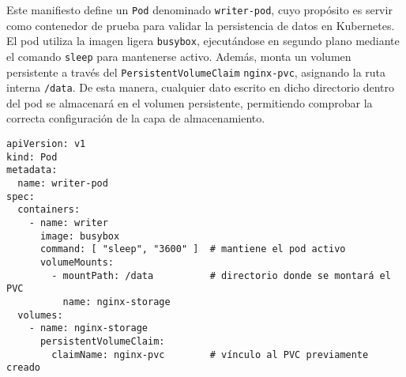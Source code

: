 Este manifiesto define un \texttt{Pod} denominado \texttt{writer-pod}, cuyo propósito es servir como contenedor de prueba para validar la persistencia de datos en Kubernetes. El pod utiliza la imagen ligera \texttt{busybox}, ejecutándose en segundo plano mediante el comando \texttt{sleep} para mantenerse activo. Además, monta un volumen persistente a través del \texttt{PersistentVolumeClaim} \texttt{nginx-pvc}, asignando la ruta interna \texttt{/data}. De esta manera, cualquier dato escrito en dicho directorio dentro del pod se almacenará en el volumen persistente, permitiendo comprobar la correcta configuración de la capa de almacenamiento.

\begin{verbatim}
apiVersion: v1
kind: Pod
metadata:
  name: writer-pod
spec:
  containers:
    - name: writer
      image: busybox
      command: [ "sleep", "3600" ]  # mantiene el pod activo
      volumeMounts:
        - mountPath: /data          # directorio donde se montará el PVC
          name: nginx-storage
  volumes:
    - name: nginx-storage
      persistentVolumeClaim:
        claimName: nginx-pvc        # vínculo al PVC previamente creado
\end{verbatim}
